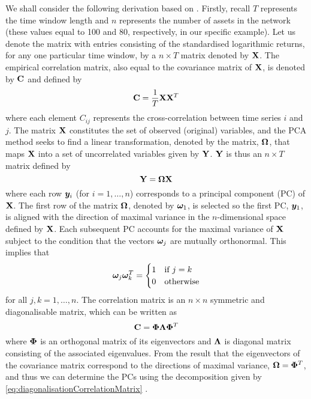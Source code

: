 We shall consider the following derivation based on \cite{Jol02,UIO03,FPM+10,FPW+11,Gil14b}.
Firstly, recall $T$ represents the time window length and $n$ represents the number of assets in the network (these values equal to 100 and 80, respectively, in our specific example).
Let us denote the matrix with entries consisting of the standardised logarithmic returns, for any one particular time window, by a $n \times T$ matrix denoted by $\mathbf X$.
The empirical correlation matrix, also equal to the covariance matrix of $\mathbf X$, is denoted by $\mathbf C$ and defined by
\begin{equation}
	\label{eq:correlationMatrix}
	\mathbf C = \frac{1}{T} \mathbf X \mathbf X^{T}
\end{equation}
where each element $C_{ij}$ represents the cross-correlation between time series $i$ and $j$.
The matrix $\mathbf X$ constitutes the set of observed (original) variables, and the PCA method seeks to find a linear transformation, denoted by the matrix, $\mathbf\Omega$, that maps $\mathbf X$ into a set of uncorrelated variables given by $\mathbf Y$.
$\mathbf Y$ is thus an $n \times T$ matrix defined by
\begin{equation}
	\label{eq:uncorrelatedVariables}
	\mathbf Y = \mathbf\Omega \mathbf X 
\end{equation}
where each row $\vecvar{y}_{i}$ (for $i =1,\dots,n$) corresponds to a principal component (PC) of $\mathbf X$.
The first row of the matrix $\mathbf\Omega$, denoted by $\vecvar{\omega}_{1}$, is selected so the first PC, $\vecvar{y}_{1}$, is aligned with the direction of maximal variance in the $n$-dimensional space defined by $\mathbf X$.
Each subsequent PC accounts for the maximal variance of $\mathbf X$ subject to the condition that the vectors $\vecvar{\omega}_{j}$ are mutually orthonormal.
This implies that
\begin{equation}
	\label{eq:PCCoefficients}
	 \vecvar{\omega}_{j} \transpose{\vecvar{\omega}_{k}} =
	\begin{cases}
		1 & \text{if } j = k\\
		0 & \text{otherwise}
	\end{cases}
\end{equation}
for all $j,k = 1,\dots,n$.
The correlation matrix is an $n \times n$ symmetric and diagonalisable matrix, which can be written as 
\begin{equation}
	\label{eq:diagonalisationCorrelationMatrix}
	\mathbf C = \mathbf\Phi \mathbf\Lambda \mathbf\Phi^{T}
\end{equation}
where $\mathbf\Phi$ is an orthogonal matrix of its eigenvectors and $\mathbf\Lambda$ is diagonal matrix consisting of the associated eigenvalues.
From the result that the eigenvectors of the covariance matrix correspond to the directions of maximal variance, $\mathbf\Omega = \mathbf\Phi^{T}$, and thus we can determine the PCs using the decomposition given by \cref{eq:diagonalisationCorrelationMatrix} \cite{Jol02}.

